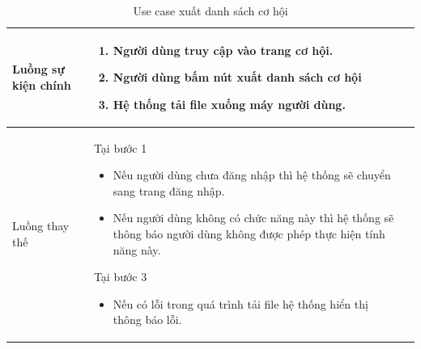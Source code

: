 \documentclass[12pt,a4paper]{article}
\begin{document}
\begin{table}[H]
\begin{tabular}{|p{3.5cm}|p{11.5cm}|c|}
            Luồng sự kiện chính & \vspace{-.8cm}\begin{enumerate}
                                                    \item Người dùng truy cập vào trang cơ hội.
                                                    \item Người dùng bấm nút xuất danh sách cơ hội
                                                    \item Hệ thống tải file xuống máy người dùng.
            \end{enumerate}
            \\
            \hline
            Luồng thay thế & Tại bước 1\newline
            \vspace{-.8cm}\begin{itemize}
                              \item Nếu người dùng chưa đăng nhập thì hệ thống sẽ chuyển sang trang đăng nhập.
                              \item Nếu người dùng không có chức năng này thì hệ thống sẽ thông báo người dùng không được phép thực hiện tính năng này.
            \end{itemize}
            Tại bước 3\newline
            \vspace{-.8cm}\begin{itemize}
                              \item Nếu có lỗi trong quá trình tải file hệ thống hiển thị thông báo lỗi.
            \end{itemize}
            \\ \hline
        \end{tabular}
        \caption{Use case xuất danh sách cơ hội}

    \end{table}

\end{document}
